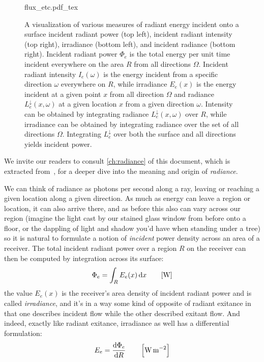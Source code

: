 \begin{figure}[tb]
    \centering
    \def\svgwidth{\linewidth}
    {flux_etc.pdf_tex}
    \caption{\label{fig:flux_etc}%
    A visualization of various measures of radiant energy incident onto a surface
    incident radiant power (top left), incident radiant intensity (top right), 
    irradiance (bottom left), and incident radiance (bottom right).
    Incident radiant power $\Phi_e$ is the total energy per unit time incident everywhere 
    on the area $R$ from all directions $\Omega$. 
    Incident radiant intensity $I_e(\omega)$ is the energy incident from a specific 
    direction $\omega$ everywhere on $R$, 
    while irradiance $E_e(x)$ is the energy incident at a given point $x$ from all direction $\Omega$ and
    radiance $L^\downarrow_e(x,\omega)$ at a given location $x$ from a given direction $\omega$.
    Intensity can be obtained by integrating radiance $L^\downarrow_e(x,\omega)$ over $R$, 
    while irradiance can be obtained by integrating radiance over the set of
    all directions $\Omega$. 
    Integrating $L^\downarrow_e$ over both the surface and all directions yields incident power. }
\end{figure}

We invite our readers to consult \cref{ch:radiance} of this document, which is extracted
from~\cite{nicodemus63}, for a deeper dive into the meaning and 
origin of \textsl{\gls{radiance}}. 

We can think of \gls{radiance} as photons per second along 
a ray, leaving or reaching a given location along a given direction.
As much as energy can leave a region or location, it can also
arrive there, and as before this also can vary across our region 
(imagine the light cast by our stained glass window from before onto a floor,
or the dappling of light and shadow you'd have when standing under a tree)
so it is natural to formulate a notion of \emph{incident} power density across 
an area of a receiver. 
The total incident radiant power over a region $R$ on the receiver can then be computed by
integration across its surface:
\begin{equation}
	\Phi_e = \int_{R} E_e(x) \d x \qquad [\unit{\watt}]
\end{equation}
the value $E_e(x)$ is the receiver's area density of incident radiant power and
is called \textit{irradiance}, and it's in a way some kind of opposite of radiant exitance
in that one describes incident flow while the other described exitant flow.
And indeed, exactly like radiant exitance, irradiance as well has a differential formulation:
\begin{equation}
	E_e = \frac{\d\Phi_e}{\d R} \qquad \left[\unit{\watt\per\square\meter}\right]
\end{equation}


